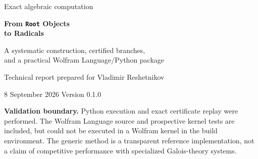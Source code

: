 \documentclass[11pt,a4paper]{article}
\theoremstyle{definition}
\theoremstyle{remark}
\begin{document}
\begin{titlepage}
\vspace*{16mm}
{\Large\color{inkblue} Exact algebraic computation\par}
\vspace{9mm}
{\Huge\bfseries From \texttt{Root} Objects\\[3mm] to Radicals\par}
\vspace{8mm}
{\Large A systematic construction, certified branches,\\and a practical Wolfram Language/Python package\par}
\vspace{14mm}
{\large Technical report prepared for Vladimir Reshetnikov\par}
\vspace{2mm}
{8 September 2026 \quad\textbullet\quad Version 0.1.0\par}
\vspace{12mm}
\begin{abstract}
An exact algebraic number is expressible by radicals precisely when the Galois group of its minimal polynomial is solvable. Turning this characterization into useful software requires considerably more than testing a group: one must construct the intermediate fields, produce nonzero Kummer generators, preserve the intended complex embedding, and distinguish a resource failure from a mathematical obstruction.

This report develops and implements a deterministic splitting-field construction. A finite trace-and-Fourier search supplies a generator at each cyclic prime-degree step; exact rational linear algebra expresses the resulting radicands in the preceding field. Root separation certifies all choices of principal radical branches. A replayable certificate separates the algebraic result from the search that found it.

The general constructor is preceded by exact low-degree, Dickson-polynomial, and pair-sum-resolvent methods. These recover both examples in the original question and substantially improve the practical range. The distribution includes a tested SymPy implementation, a Wolfram Language interface with native shortcuts and exact final verification, regression tests, and the supplied experimental notebook. Mathematical completeness is stated separately from practical bounds and from the actual scope of validation.
\end{abstract}
\vfill
\small
\textbf{Validation boundary.} Python execution and exact certificate replay were performed. The Wolfram Language source and prospective kernel tests are included, but could not be executed in a Wolfram kernel in the build environment. The generic method is a transparent reference implementation, not a claim of competitive performance with specialized Galois-theory systems.
\end{titlepage}
\end{document}
